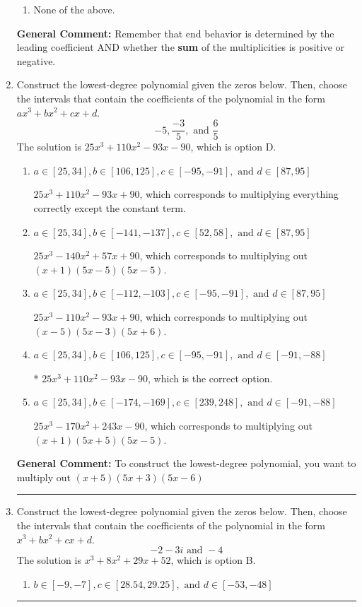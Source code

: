 \documentclass{extbook}[14pt]
\newcommand{\litem}[1]{\item #1

\rule{\textwidth}{0.4pt}}
\begin{document}
\begin{enumerate}
{\begin{enumerate}[label=\Alph*.]
\begin{multicols}{2}
\end{multicols}\item None of the above.\end{enumerate}
\textbf{General Comment:} Remember that end behavior is determined by the leading coefficient AND whether the \textbf{sum} of the multiplicities is positive or negative.
}
\litem{
Construct the lowest-degree polynomial given the zeros below. Then, choose the intervals that contain the coefficients of the polynomial in the form $ax^3+bx^2+cx+d$.
\[ -5, \frac{-3}{5}, \text{ and } \frac{6}{5} \]
The solution is \( 25x^{3} +110 x^{2} -93 x -90 \), which is option D.\begin{enumerate}[label=\Alph*.]
\item \( a \in [25, 34], b \in [106, 125], c \in [-95, -91], \text{ and } d \in [87, 95] \)

$25x^{3} +110 x^{2} -93 x + 90$, which corresponds to multiplying everything correctly except the constant term.
\item \( a \in [25, 34], b \in [-141, -137], c \in [52, 58], \text{ and } d \in [87, 95] \)

$25x^{3} -140 x^{2} +57 x + 90$, which corresponds to multiplying out $(x + 1)(5x -5)(5x -5)$.
\item \( a \in [25, 34], b \in [-112, -103], c \in [-95, -91], \text{ and } d \in [87, 95] \)

$25x^{3} -110 x^{2} -93 x + 90$, which corresponds to multiplying out $(x -5)(5x -3)(5x + 6)$.
\item \( a \in [25, 34], b \in [106, 125], c \in [-95, -91], \text{ and } d \in [-91, -88] \)

* $25x^{3} +110 x^{2} -93 x -90$, which is the correct option.
\item \( a \in [25, 34], b \in [-174, -169], c \in [239, 248], \text{ and } d \in [-91, -88] \)

$25x^{3} -170 x^{2} +243 x -90$, which corresponds to multiplying out $(x + 1)(5x + 5)(5x -5)$.
\end{enumerate}

\textbf{General Comment:} To construct the lowest-degree polynomial, you want to multiply out $(x + 5)(5x + 3)(5x -6)$
}
\litem{
Construct the lowest-degree polynomial given the zeros below. Then, choose the intervals that contain the coefficients of the polynomial in the form $x^3+bx^2+cx+d$.
\[ -2 - 3 i \text{ and } -4 \]
The solution is \( x^{3} +8 x^{2} +29 x + 52 \), which is option B.\begin{enumerate}[label=\Alph*.]
\item \( b \in [-9, -7], c \in [28.54, 29.25], \text{ and } d \in [-53, -48] \)


\end{enumerate}}
\end{enumerate}
\end{document}
